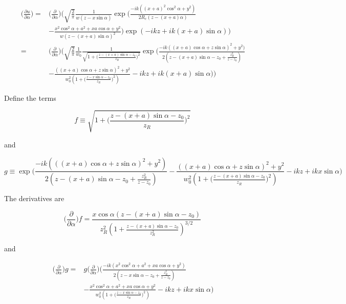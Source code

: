 \documentclass[aps,twoside,secnumarabic,balancelastpage,amsmath,amssymb,nofootinbib,hyperref=pdftex]{revtex4}
\begin{document}
\begin{align*}
    \big( \frac{\partial u}{\partial \alpha} \big)  =&
        \big( \frac{\partial}{\partial \alpha} \big)
        \big(
            \sqrt{\frac{2}{\pi}}
            \frac{1}{w(z-x \sin \alpha)}
            \exp \Big(\frac{-ik((x+a)^{2}\cos^2 				\alpha			
            +y^{2})}{2R_{c}(z-(x+a) \alpha)} \\& -
            \frac{x^{2}\cos^2 \alpha + a^2 + x a 		\cos \alpha +y^{2}}{w(z-(x+a) \sin \alpha)^{2}} \Big)		
            \exp(
            -ikz + ik(x+a) \sin \alpha)
        \big)
        \\ =&
        \big( \frac{\partial}{\partial \alpha} \big)
        \big(
            \sqrt{\frac{2}{\pi}} \frac{1}{w_0}
            \frac{1}{\sqrt{1 + \big( \frac{z-(x+a) \sin \alpha-z_0}{z_R} \big)^2}}
            \exp \Big(\frac{-ik( (x+a)\cos \alpha + z \sin \alpha)^2			
            +y^{2})}{2(z-(x+a) \sin \alpha - z_0+ \frac{z_R^2}{z-z_0})} \\& -
            \frac{ ( (x+a)\cos \alpha + z \sin \alpha)^2 +y^{2}}{w_0^2 ( 1 + \big( \frac{z-x \sin \alpha-z_0}{z_R} \big)^2)} -ikz + ik(x+a) \sin \alpha		\Big) \big)
\end{align*}

Define the terms

\begin{equation}
    f \equiv \sqrt{1 + \big( \frac{z- (x+a) \sin \alpha-z_0}{z_R} \big)^2}
    \,
\end{equation}

and

\begin{equation}
g \equiv \exp \Big(\frac{-ik(((x+a)\cos \alpha + z \sin \alpha)^2			
                +y^{2})}{2(z-(x+a) \sin \alpha - z_0+ \frac{z_R^2}{z-z_0})}-
                    \frac{((x+a)\cos \alpha + z \sin \alpha)^2 +y^{2}}{w_0^2 ( 1 + \big( \frac{z-(x+a) \sin \alpha-z_0}{z_R} \big)^2)} -ikz + ikx \sin \alpha		\Big) 
\end{equation}

The derivatives are

\begin{equation}
    \big( \frac{\partial}{\partial \alpha} \big) f
    =
    \frac{x \cos \alpha(z-(x+a) \sin \alpha - z_0)}{z_R^2 (1+ \frac{z - (x+a) \sin \alpha - z_0}{z_R^2})^{3/2}}
    \,
\end{equation}

and

\begin{align*}
    \big( \frac{\partial}{\partial \alpha} \big) g  =& 
    	g \big( \frac{\partial}{\partial \alpha} \big)
    	\Big(\frac{-ik(x^{2}\cos^2 \alpha + a^2 + x a \cos \alpha			
        +y^{2})}{2(z-x \sin \alpha - z_0+ \frac{z_R^2}{z-z_0})} \\&-
        \frac{x^{2}\cos^2 \alpha + a^2 + x a \cos \alpha +y^{2}}{w_0^2 ( 1 + 			\big( \frac{z-x \sin \alpha-z_0}{z_R} \big)^2)} -ikz + ikx \sin \alpha			\Big)
\end{align*}
\end{document}
